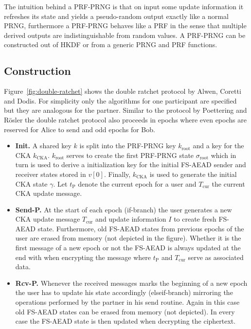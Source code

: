 \documentclass[11pt,a4paper,twoside,openright,bibliography=totoc]{scrbook}
\renewcommand{\t}{\text} %
\begin{document}
The intuition behind a PRF-PRNG is that on input some update information
it refreshes its state and yields a pseudo-random output exactly like
a normal PRNG, furthermore a PRF-PRNG behaves like a PRF in the sense
that multiple derived outputs are indistinguishable from random
values. A PRF-PRNG can be constructed out of HKDF or from
a generic PRNG and PRF functions.

\subsection{Construction}
\label{sec:construction-4}

Figure~\ref{fig:double-ratchet} shows the double ratchet protocol by
Alwen, Coretti and Dodis. For simplicity only the algorithms
for one participant are specified but they are analogous for
the partner. Similar to the protocol by Poettering and Rösler
the double ratchet protocol also proceeds in epochs where
even epochs are reserved for Alice to send and odd epochs for Bob.
\begin{itemize}
\item \textbf{Init.} A shared key $k$ is split into the PRF-PRNG key
  $k_\t{root}$ and a key for the CKA $k_\t{CKA}$. $k_\t{root}$ serves
  to create the first PRF-PRNG state $\sigma_\t{root}$ which in
  turn is used to derive a initialization key for the initial
  FS-AEAD sender and receiver states stored in $v[0]$. Finally,
  $k_\t{CKA}$ is used to generate the initial CKA state $\gamma$. Let
  $t_\t{P}$ denote the current epoch for a user and $T_\t{cur}$ the
  current CKA update message.
\item \textbf{Send-P.} At the start of each epoch (if-branch) the user
  generates a new CKA update message $T_\t{cur}$ and update information $I$
  to create fresh FS-AEAD state. Furthermore, old FS-AEAD states from previous
  epochs of the user are erased from memory (not depicted in the figure).
  Whether it is the first message of a new epoch or not the FS-AEAD is
  always updated at the end with when encrypting
  the message where $t_\t{P}$ and $T_\t{cur}$ serve as associated data.
\item \textbf{Rcv-P.} Whenever the received messages marks the beginning
  of a new epoch the user has to update his state accordingly (elseif-branch)
  mirroring the operations performed by the partner in his send
  routine. Again in this case old FS-AEAD states can be erased
  from memory (not depicted). In every case the FS-AEAD state
  is then updated when decrypting the ciphertext.
\end{itemize}
\end{document}
